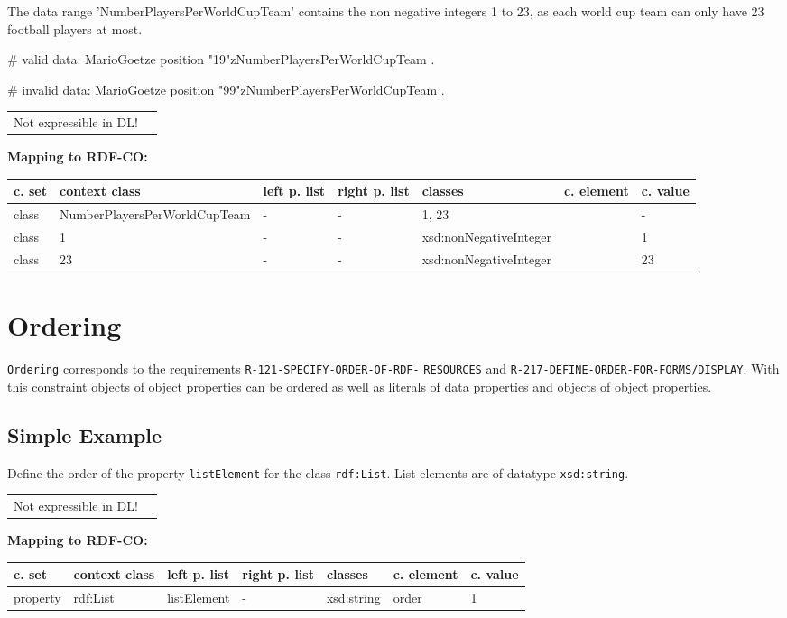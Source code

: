\documentclass{llncs}
\newcommand{\ms}[1]{\texttt{#1}}
\newenvironment{gcotable}{
  \scriptsize
  \sffamily
  \vspace{0cm}
	\begin{center}
	\textbf{\vspace{0.4cm}Mapping to RDF-CO:} \\
  \begin{tabular}{l|l|l|l|l|l|l}
	\hline
  \textbf{c. set} & \textbf{context class} & \textbf{left p. list} & \textbf{right p. list} & \textbf{classes} & \textbf{c. element} & \textbf{c. value} \\
  \hline

}{
  \hline
  \end{tabular}
	\end{center}
}
\newenvironment{DL}{
\vspace{0cm}
	\begin{center}
  \begin{tabular}{r l}

}{
  \end{tabular}
	\end{center}
}
\begin{document}
The data range 'NumberPlayersPerWorldCupTeam' contains the non negative integers 1 to 23, as each world cup team can only have 23 football players at most.

\begin{ex}
# valid data:
MarioGoetze
    position "19"^^:NumberPlayersPerWorldCupTeam .
\end{ex}

\begin{ex}
# invalid data:
MarioGoetze
    position "99"^^:NumberPlayersPerWorldCupTeam .
\end{ex}



\begin{DL}
Not expressible in DL!
\end{DL}


\begin{gcotable}
class & NumberPlayersPerWorldCupTeam & - & - & 1, 23 &  & - \\
class & 1 & - & - & xsd:nonNegativeInteger &  & 1 \\
class & 23 & - & - & xsd:nonNegativeInteger &  & 23 \\
\end{gcotable}


\section{Ordering}

\ms{Ordering} corresponds to the requirements
\ms{R-121-SPECIFY-ORDER-OF-RDF-} \ms{RESOURCES} and
\ms{R-217-DEFINE-ORDER-FOR-FORMS/DISPLAY}.
With this constraint objects of object properties can be ordered as well as literals of data properties and objects of object properties.

\subsection{Simple Example}

Define the order of the property \ms{listElement} for the class \ms{rdf:List}.
List elements are of datatype \ms{xsd:string}.

\begin{DL}
Not expressible in DL!
\end{DL}

\begin{gcotable}
property & rdf:List & listElement & - & xsd:string & order & 1 \\
\end{gcotable}
\end{document}
